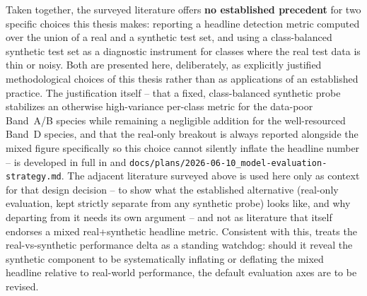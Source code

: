 Taken together, the surveyed literature offers \textbf{no established precedent} for two specific choices this thesis makes: reporting a headline detection metric computed over the union of a real and a synthetic test set, and using a class-balanced synthetic test set as a diagnostic instrument for classes where the real test data is thin or noisy. Both are presented here, deliberately, as explicitly justified methodological choices of this thesis rather than as applications of an established practice. The justification itself -- that a fixed, class-balanced synthetic probe stabilizes an otherwise high-variance per-class metric for the data-poor Band~A/B species while remaining a negligible addition for the well-resourced Band~D species, and that the real-only breakout is always reported alongside the mixed figure specifically so this choice cannot silently inflate the headline number -- is developed in full in  and \texttt{docs/plans/2026-06-10\_model-evaluation-strategy.md}. The adjacent literature surveyed above is used here only as context for that design decision -- to show what the established alternative (real-only evaluation, kept strictly separate from any synthetic probe) looks like, and why departing from it needs its own argument -- and not as literature that itself endorses a mixed real+synthetic headline metric. Consistent with this,  treats the real-vs-synthetic performance delta as a standing watchdog: should it reveal the synthetic component to be systematically inflating or deflating the mixed headline relative to real-world performance, the default evaluation axes are to be revised.
